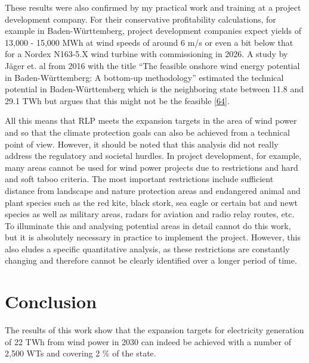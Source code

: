 \documentclass[a4paper,11pt]{article}
\begin{document}
These results were also confirmed by my practical work and training at a project development company. For their conservative profitability calculations, for example in Baden-Württemberg, project development companies expect yields of 13,000 - 15,000 MWh at wind speeds of around 6 m/s or even a bit below that for a Nordex N163-5.X wind turbine with commissioning in 2026. A study by Jäger et. al from 2016 with the title ``The feasible onshore wind energy potential in Baden-Württemberg: A bottom-up methodology'' estimated the technical potential in Baden-Württemberg which is the neighboring state between 11.8 and 29.1 TWh but argues that this might not be the feasible {[}\protect\hyperlink{ref-Jager.2016}{64}{]}.

\newpage

All this means that RLP meets the expansion targets in the area of wind power and so that the climate protection goals can also be achieved from a technical point of view. However, it should be noted that this analysis did not really address the regulatory and societal hurdles. In project development, for example, many areas cannot be used for wind power projects due to restrictions and hard and soft taboo criteria. The most important restrictions include sufficient distance from landscape and nature protection areas and endangered animal and plant species such as the red kite, black stork, sea eagle or certain bat and newt species as well as military areas, radars for aviation and radio relay routes, etc. To illuminate this and analysing potential areas in detail cannot do this work, but it is absolutely necessary in practice to implement the project. However, this also eludes a specific quantitative analysis, as these restrictions are constantly changing and therefore cannot be clearly identified over a longer period of time.

\newpage

\hypertarget{conclusion}{%
\section{Conclusion}\label{conclusion}}

The results of this work show that the expansion targets for electricity generation of 22 TWh from wind power in 2030 can indeed be achieved with a number of 2,500 WTs and covering 2 \% of the state.
\end{document}
